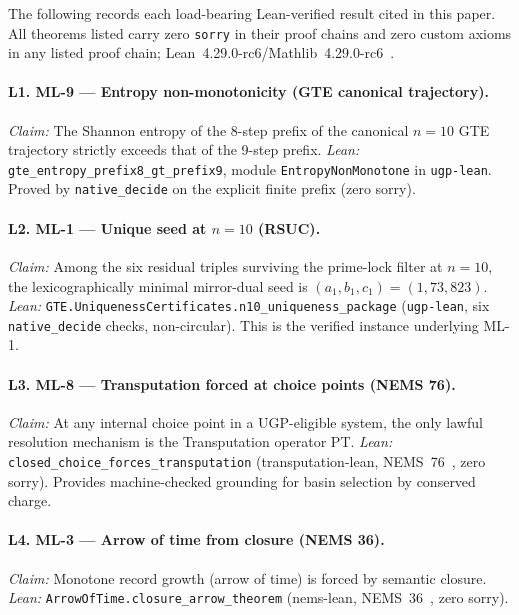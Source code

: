 \documentclass[11pt]{article}
\begin{document}
The following records each load-bearing Lean-verified result cited in this paper. All theorems listed carry zero \texttt{sorry} in their proof chains and zero custom axioms in any listed proof chain; Lean~4.29.0-rc6/Mathlib~4.29.0-rc6~\cite{SpivackUGPFormalization,ugp-lean}.

\paragraph{L1. ML-9 — Entropy non-monotonicity (GTE canonical trajectory).}
\textit{Claim:} The Shannon entropy of the 8-step prefix of the canonical $n=10$ GTE trajectory strictly exceeds that of the 9-step prefix.
\textit{Lean:} \texttt{gte\_entropy\_prefix8\_gt\_prefix9}, module \texttt{EntropyNonMonotone} in \texttt{ugp-lean}. Proved by \texttt{native\_decide} on the explicit finite prefix (zero sorry).

\paragraph{L2. ML-1 — Unique seed at $n=10$ (RSUC).}
\textit{Claim:} Among the six residual triples surviving the prime-lock filter at $n=10$, the lexicographically minimal mirror-dual seed is $(a_1,b_1,c_1)=(1,73,823)$.
\textit{Lean:} \texttt{GTE.UniquenessCertificates\allowbreak.n10\_uniqueness\_package} (\texttt{ugp-lean}, six \texttt{native\_decide} checks, non-circular). This is the verified instance underlying ML-1.

\paragraph{L3. ML-8 — Transputation forced at choice points (NEMS 76).}
\textit{Claim:} At any internal choice point in a UGP-eligible system, the only lawful resolution mechanism is the Transputation operator PT.
\textit{Lean:} \texttt{closed\_choice\_forces\_transputation} (transputation-lean, NEMS~76~\cite{SpivackNEMS76}, zero sorry). Provides machine-checked grounding for basin selection by conserved charge.

\paragraph{L4. ML-3 — Arrow of time from closure (NEMS 36).}
\textit{Claim:} Monotone record growth (arrow of time) is forced by semantic closure.
\textit{Lean:} \texttt{ArrowOfTime.closure\_arrow\_theorem} (nems-lean, NEMS~36~\cite{SpivackNEMS36}, zero sorry).
\end{document}
